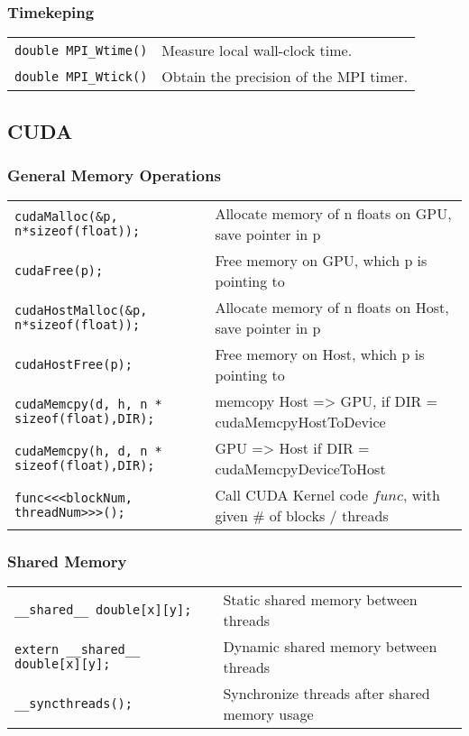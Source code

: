 \documentclass[11pt]{article}
\begin{document}
\subsubsection{Timekeping}

\begin{tabular}{ p{8cm} l }
	\lstinline$double MPI_Wtime()$ & Measure local wall-clock time. \\
	\lstinline$double MPI_Wtick()$ & Obtain the precision of the MPI timer. \\
\end{tabular}

\subsection{CUDA}


\subsubsection{General Memory Operations}
\begin{tabular}{ p{7cm} l }
	\lstinline$cudaMalloc(&p, n*sizeof(float));$ &  Allocate memory of n floats on GPU, save pointer in p\\
	\lstinline$cudaFree(p);$& Free memory on GPU, which p is pointing to\\
	\lstinline$cudaHostMalloc(&p, n*sizeof(float));$ &  Allocate memory of n floats on Host, save pointer in p\\
	\lstinline$cudaHostFree(p);$& Free memory on Host, which p is pointing to\\
	\lstinline$cudaMemcpy(d, h, n * sizeof(float),DIR);$ &  memcopy Host => GPU, if DIR = cudaMemcpyHostToDevice \\
	\lstinline$cudaMemcpy(h, d, n * sizeof(float),DIR);$& GPU => Host if DIR = cudaMemcpyDeviceToHost\\
	\lstinline$func<<<blockNum, threadNum>>>();$ & Call CUDA Kernel code $func$, with given \# of blocks / threads\\
\end{tabular}

\subsubsection{Shared Memory}
\begin{tabular}{ p{7cm} l }
	\lstinline$__shared__ double[x][y];$ & Static shared memory between threads\\
	\lstinline$extern __shared__ double[x][y];$ & Dynamic shared memory between threads\\
	\lstinline$__syncthreads();$ & Synchronize threads after shared memory usage	\\
\end{tabular}
\end{document}
